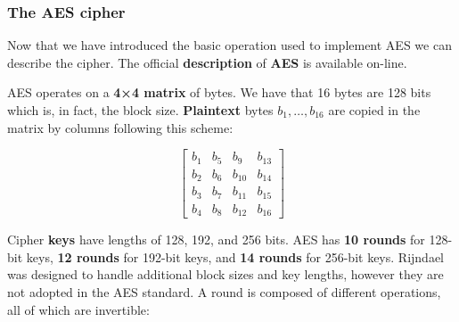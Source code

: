 \subsubsection{The AES cipher}
Now that we have introduced the basic operation used to implement AES we can describe the cipher. The official \textbf{description} of \textbf{AES} is available on-line.

AES operates on a \textbf{4×4 matrix} of bytes. We have that 16 bytes are 128 bits which is, in fact, the block size. \textbf{Plaintext} bytes $b_1,\ldots,b_{16}$ are copied in the matrix by columns following this scheme:

$$  \begin{bmatrix}b_1&b_5&b_9&b_{13}\\b_2&b_6&b_{10}&b_{14}\\b_{3}&b_7&b_{11}&b_{15}\\b_4&b_8&b_{12}&b_{16}
    \end{bmatrix}
$$

Cipher \textbf{keys} have lengths of 128, 192, and 256 bits. AES has \textbf{10 rounds} for 128-bit keys, \textbf{12 rounds} for 192-bit keys, and \textbf{14 rounds} for 256-bit keys. Rijndael was designed to handle additional block sizes and key lengths, however they are not adopted in the AES standard. A round is composed of different operations, all of which are invertible:

